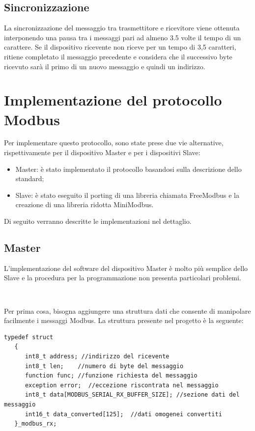 \documentclass[a4paper,titlepage]{book}
\begin{document}
\subsection{Sincronizzazione}
La sincronizzazione del messaggio tra trasmettitore e ricevitore viene ottenuta interponendo una pausa tra i messaggi pari ad almeno 3.5 volte il tempo di un carattere. Se il dispositivo ricevente non riceve per un tempo di 3,5 caratteri, ritiene completato il messaggio precedente e considera che il successivo byte ricevuto sarà il primo di un nuovo messaggio e quindi un indirizzo.


\section{Implementazione del protocollo Modbus}

Per implementare questo protocollo, sono state prese due vie alternative, rispettivamente per il dispositivo Master e per i dispositivi Slave:

\begin{itemize}[noitemsep,topsep=15pt,parsep=10pt,partopsep=0pt]

\item Master: è stato implementato il protocollo basandosi sulla descrizione dello standard;
\item Slave: è stato eseguito il porting di una libreria chiamata FreeModbus e la creazione di una libreria ridotta MiniModbus.

\end{itemize}

Di seguito verranno descritte le implementazioni nel dettaglio.

\subsection{Master}

L'implementazione del software del dispositivo Master è molto più semplice dello Slave e la procedura per la programmazione non presenta particolari problemi.

~

Per prima cosa, bisogna aggiungere una struttura dati che consente di manipolare facilmente i messaggi Modbus. La struttura presente nel progetto è la seguente:

\begin{lstlisting}[showlines=false]
typedef struct
   {
      int8_t address; //indirizzo del ricevente
      int8_t len;    //numero di byte del messaggio
      function func; //funzione richiesta del messaggio
      exception error;  //eccezione riscontrata nel messaggio
      int8_t data[MODBUS_SERIAL_RX_BUFFER_SIZE]; //sezione dati del messaggio
      int16_t data_converted[125];  //dati omogenei convertiti
   }_modbus_rx;
\end{lstlisting}
\end{document}
